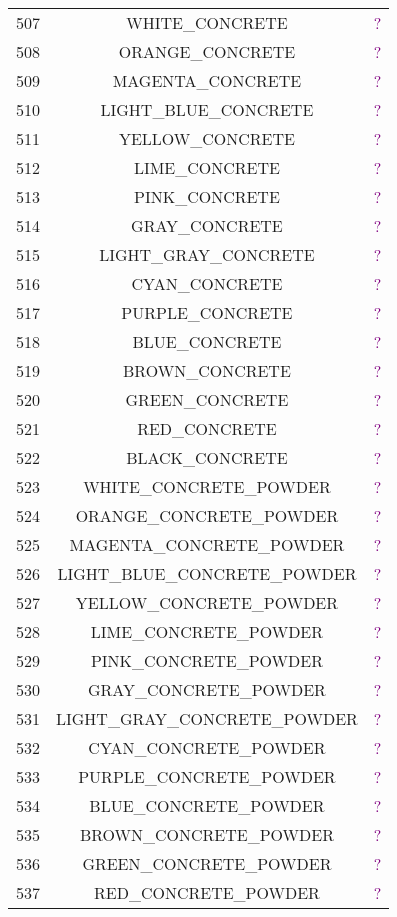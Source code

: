 \documentclass[11pt]{article}
\newcommand\myworries[1]{\textcolor{purple}{#1}}
\begin{document}
\begin{longtable}{ |c|c|c| }
	507 & WHITE\_CONCRETE & \myworries{?} \\
	508 & ORANGE\_CONCRETE & \myworries{?} \\
	509 & MAGENTA\_CONCRETE & \myworries{?} \\
	510 & LIGHT\_BLUE\_CONCRETE & \myworries{?} \\
	511 & YELLOW\_CONCRETE & \myworries{?} \\
	512 & LIME\_CONCRETE & \myworries{?} \\
	513 & PINK\_CONCRETE & \myworries{?} \\
	514 & GRAY\_CONCRETE & \myworries{?} \\
	515 & LIGHT\_GRAY\_CONCRETE & \myworries{?} \\
	516 & CYAN\_CONCRETE & \myworries{?} \\
	517 & PURPLE\_CONCRETE & \myworries{?} \\
	518 & BLUE\_CONCRETE & \myworries{?} \\
	519 & BROWN\_CONCRETE & \myworries{?} \\
	520 & GREEN\_CONCRETE & \myworries{?} \\
	521 & RED\_CONCRETE & \myworries{?} \\
	522 & BLACK\_CONCRETE & \myworries{?} \\
	523 & WHITE\_CONCRETE\_POWDER & \myworries{?} \\
	524 & ORANGE\_CONCRETE\_POWDER & \myworries{?} \\
	525 & MAGENTA\_CONCRETE\_POWDER & \myworries{?} \\
	526 & LIGHT\_BLUE\_CONCRETE\_POWDER & \myworries{?} \\
	527 & YELLOW\_CONCRETE\_POWDER & \myworries{?} \\
	528 & LIME\_CONCRETE\_POWDER & \myworries{?} \\
	529 & PINK\_CONCRETE\_POWDER & \myworries{?} \\
	530 & GRAY\_CONCRETE\_POWDER & \myworries{?} \\
	531 & LIGHT\_GRAY\_CONCRETE\_POWDER & \myworries{?} \\
	532 & CYAN\_CONCRETE\_POWDER & \myworries{?} \\
	533 & PURPLE\_CONCRETE\_POWDER & \myworries{?} \\
	534 & BLUE\_CONCRETE\_POWDER & \myworries{?} \\
	535 & BROWN\_CONCRETE\_POWDER & \myworries{?} \\
	536 & GREEN\_CONCRETE\_POWDER & \myworries{?} \\
	537 & RED\_CONCRETE\_POWDER & \myworries{?} \\

\end{longtable}
\end{document}
